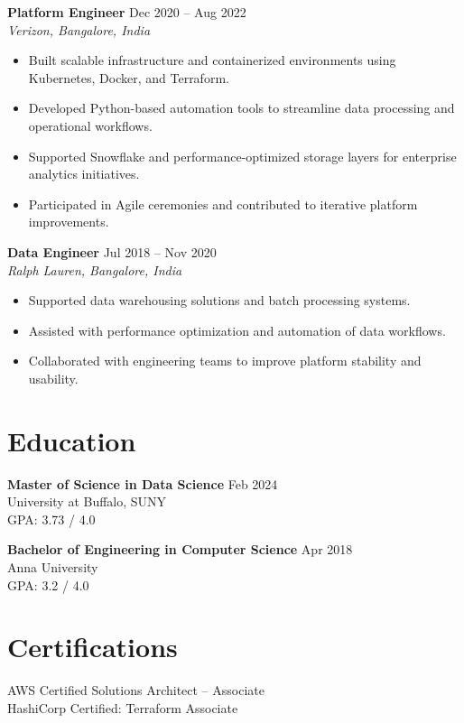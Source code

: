 \documentclass[10pt]{article}
\begin{document}
\textbf{Platform Engineer} \hfill Dec 2020 -- Aug 2022 \\
\textit{Verizon, Bangalore, India}
\begin{itemize}[leftmargin=*, itemsep=3pt]
    \item Built scalable infrastructure and containerized environments using Kubernetes, Docker, and Terraform.
    \item Developed Python-based automation tools to streamline data processing and operational workflows.
    \item Supported Snowflake and performance-optimized storage layers for enterprise analytics initiatives.
    \item Participated in Agile ceremonies and contributed to iterative platform improvements.
\end{itemize}

\textbf{Data Engineer} \hfill Jul 2018 -- Nov 2020 \\
\textit{Ralph Lauren, Bangalore, India}
\begin{itemize}[leftmargin=*, itemsep=3pt]
    \item Supported data warehousing solutions and batch processing systems.
    \item Assisted with performance optimization and automation of data workflows.
    \item Collaborated with engineering teams to improve platform stability and usability.
\end{itemize}

\section*{Education}

\textbf{Master of Science in Data Science} \hfill Feb 2024 \\
University at Buffalo, SUNY \\
GPA: 3.73 / 4.0

\textbf{Bachelor of Engineering in Computer Science} \hfill Apr 2018 \\
Anna University \\
GPA: 3.2 / 4.0

\section*{Certifications}
AWS Certified Solutions Architect – Associate \\
HashiCorp Certified: Terraform Associate
\end{document}
